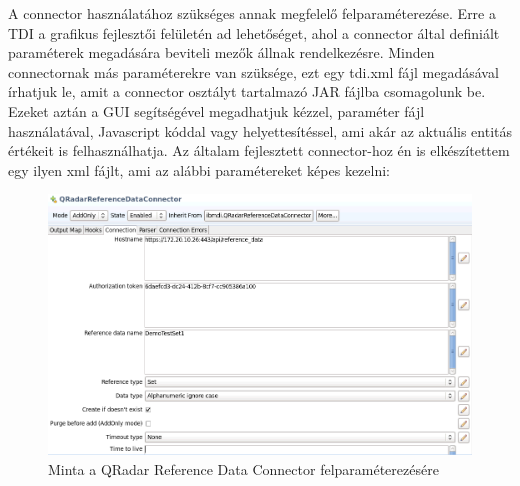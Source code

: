 A connector használatához szükséges annak megfelelő felparaméterezése. Erre a TDI a grafikus fejlesztői felületén ad lehetőséget, ahol a connector által definiált paraméterek megadására beviteli mezők állnak rendelkezésre. Minden connectornak más paraméterekre van szüksége, ezt egy tdi.xml fájl megadásával írhatjuk le, amit a connector osztályt tartalmazó JAR fájlba csomagolunk be. Ezeket aztán a GUI segítségével megadhatjuk kézzel, paraméter fájl használatával, Javascript kóddal vagy helyettesítéssel, ami akár az aktuális entitás értékeit is felhasználhatja. Az általam fejlesztett connector-hoz én is elkészítettem egy ilyen xml fájlt, ami az alábbi paramétereket képes kezelni:
\begin{figure}
	\centering
	\includegraphics[width=1.0\linewidth]{figures/conn_test/parameters}
	\caption{Minta a QRadar Reference Data Connector felparaméterezésére}
	\label{fig:parameters}
\end{figure}

